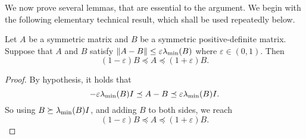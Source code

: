 We now prove several lemmas, that are essential to the argument. 
We begin with the following elementary technical result, which shall be used repeatedly below.  
\begin{lemma}
\label{lemma:sandwich}
    Let $A$ be a symmetric matrix and $B$ be a symmetric positive-definite matrix.
    Suppose that $A$ and $B$ satisfy $\|A-B\|\leq \varepsilon \lambda_{\textup{min}}(B)$ where $\varepsilon \in (0,1)$.
    Then
    \[
    (1-\varepsilon)B\preceq A\preceq (1+\varepsilon) B. 
    \]
\end{lemma}
\begin{proof}
    By hypothesis, it holds that
    \[
    -\varepsilon \lambda_{\textup{min}}(B)I\preceq A-B \preceq \varepsilon\lambda_{\textup{min}}(B) I.
    \]
    So using $B\succeq \lambda_{\textup{min}}(B) I$, and adding $B$ to both sides, we reach
    \[
    (1-\varepsilon)B \preceq A\preceq (1+\varepsilon) B.
    \]
\end{proof}


